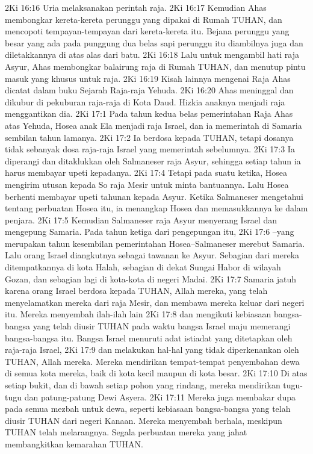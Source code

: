 2Ki 16:16  Uria melaksanakan perintah raja.
2Ki 16:17  Kemudian Ahas membongkar kereta-kereta perunggu yang dipakai di Rumah TUHAN, dan mencopoti tempayan-tempayan dari kereta-kereta itu. Bejana perunggu yang besar yang ada pada punggung dua belas sapi perunggu itu diambilnya juga dan diletakkannya di atas alas dari batu.
2Ki 16:18  Lalu untuk mengambil hati raja Asyur, Ahas membongkar balairung raja di Rumah TUHAN, dan menutup pintu masuk yang khusus untuk raja.
2Ki 16:19  Kisah lainnya mengenai Raja Ahas dicatat dalam buku Sejarah Raja-raja Yehuda.
2Ki 16:20  Ahas meninggal dan dikubur di pekuburan raja-raja di Kota Daud. Hizkia anaknya menjadi raja menggantikan dia.
2Ki 17:1  Pada tahun kedua belas pemerintahan Raja Ahas atas Yehuda, Hosea anak Ela menjadi raja Israel, dan ia memerintah di Samaria sembilan tahun lamanya.
2Ki 17:2  Ia berdosa kepada TUHAN, tetapi dosanya tidak sebanyak dosa raja-raja Israel yang memerintah sebelumnya.
2Ki 17:3  Ia diperangi dan ditaklukkan oleh Salmaneser raja Asyur, sehingga setiap tahun ia harus membayar upeti kepadanya.
2Ki 17:4  Tetapi pada suatu ketika, Hosea mengirim utusan kepada So raja Mesir untuk minta bantuannya. Lalu Hosea berhenti membayar upeti tahunan kepada Asyur. Ketika Salmaneser mengetahui tentang perbuatan Hosea itu, ia menangkap Hosea dan memasukkannya ke dalam penjara.
2Ki 17:5  Kemudian Salmaneser raja Asyur menyerang Israel dan mengepung Samaria. Pada tahun ketiga dari pengepungan itu,
2Ki 17:6  --yang merupakan tahun kesembilan pemerintahan Hosea--Salmaneser merebut Samaria. Lalu orang Israel diangkutnya sebagai tawanan ke Asyur. Sebagian dari mereka ditempatkannya di kota Halah, sebagian di dekat Sungai Habor di wilayah Gozan, dan sebagian lagi di kota-kota di negeri Madai.
2Ki 17:7  Samaria jatuh karena orang Israel berdosa kepada TUHAN, Allah mereka, yang telah menyelamatkan mereka dari raja Mesir, dan membawa mereka keluar dari negeri itu. Mereka menyembah ilah-ilah lain
2Ki 17:8  dan mengikuti kebiasaan bangsa-bangsa yang telah diusir TUHAN pada waktu bangsa Israel maju memerangi bangsa-bangsa itu. Bangsa Israel menuruti adat istiadat yang ditetapkan oleh raja-raja Israel,
2Ki 17:9  dan melakukan hal-hal yang tidak diperkenankan oleh TUHAN, Allah mereka. Mereka mendirikan tempat-tempat penyembahan dewa di semua kota mereka, baik di kota kecil maupun di kota besar.
2Ki 17:10  Di atas setiap bukit, dan di bawah setiap pohon yang rindang, mereka mendirikan tugu-tugu dan patung-patung Dewi Asyera.
2Ki 17:11  Mereka juga membakar dupa pada semua mezbah untuk dewa, seperti kebiasaan bangsa-bangsa yang telah diusir TUHAN dari negeri Kanaan. Mereka menyembah berhala, meskipun TUHAN telah melarangnya. Segala perbuatan mereka yang jahat membangkitkan kemarahan TUHAN.
